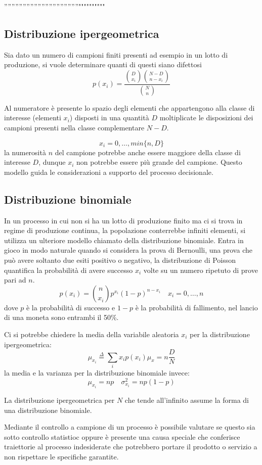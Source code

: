 ''''''''''''''''''''''''''''''''''''''''""""""""""\subsection{Distribuzione ipergeometrica}
Sia dato un numero di campioni finiti presenti ad esempio in un lotto di produzione, si vuole determinare quanti di questi siano difettosi
$$
p(x_i) = \frac{\binom{D}{x_i}\binom{N-D}{n-x_i}}{\binom{N}{n} }
$$

Al numeratore è presente lo spazio degli elementi che appartengono alla classe 
di interesse (elementi $x_i$) disposti in una quantità $D$ moltiplicate le 
disposizioni dei campioni presenti nella classe complementare $N-D$.

$$
x_i = 0, \ldots , min\{n,D\}
$$
la numerosità $n$ del campione potrebbe anche essere maggiore della classe di 
interesse $D$, dunque $x_i$ non potrebbe essere più grande del campione.
Questo modello guida le considerazioni a supporto del processo decisionale.

\subsection{Distribuzione binomiale}
In un processo in cui non si ha un lotto di produzione finito ma ci si trova in 
regime di produzione continua, la popolazione conterrebbe infiniti elementi, si 
utilizza un ulteriore modello chiamato della distribuzione binomiale.
Entra in gioco in modo naturale quando si considera la prova di Bernoulli, una 
prova che può avere soltanto due esiti positivo o negativo, la distribuzione di 
Poisson quantifica la probabilità di avere successo $x_i$ volte su un numero 
ripetuto di prove pari ad $n$. 
$$
p(x_i) = \binom{n}{x_i}p^{x_i}(1-p)^{n-x_i} \quad x_i =0,\ldots,n
$$
dove $p$ è la probabilità di successo e $1-p$ è la probabilità di fallimento, 
nel lancio di una moneta sono entrambi il 50\%.

Ci si potrebbe chiedere la media della variabile aleatoria $x_i$ per la 
distribuzione ipergeometrica:
$$
\mu_{x_i} \stackrel{\Delta}{=} \sum_i x_i p(x_i) \mu_x = n\frac{D}{N}
$$
la media e la varianza per la distribuzione binomiale invece:
$$
\mu_{x_i} = np \quad \sigma^2_{x_i} = np(1-p)
$$

La distribuzione ipergeometrica per $N$ che tende all'infinito assume la forma 
di una distribuzione binomiale.

Mediante il controllo a campione di un processo è possibile valutare se questo 
sia sotto controllo statistioc oppure è presente una causa speciale che 
conferisce traiettorie al processo indesiderate che potrebbero portare il 
prodotto o servizio a non rispettare le specifiche garantite.


